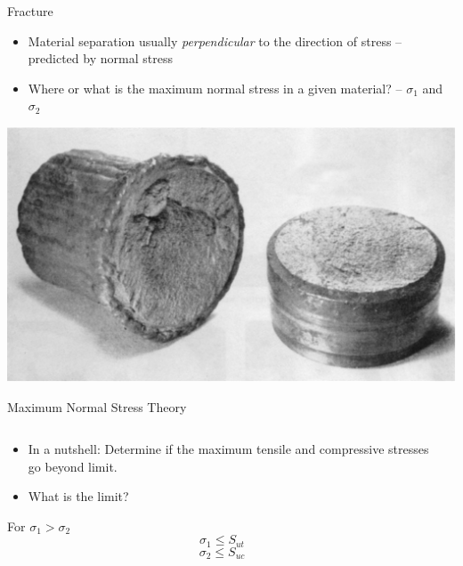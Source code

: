 \documentclass[10pt, svgnames]{beamer}
\begin{document}
\begin{frame}[label={sec:org1c5aaf5}]{Fracture}
\begin{itemize}
\item Material separation usually \emph{perpendicular} to the direction of stress -- predicted by normal stress
\item Where or what is the maximum normal stress in a given material? -- \(\sigma_1\) and \(\sigma_2\)
\end{itemize}

\begin{center}
\includegraphics[width=.9\linewidth]{pictures/brittle-failure.pdf}
\end{center}
\end{frame}

\begin{frame}[label={sec:orga01fd15}]{Maximum Normal Stress Theory}
\begin{columns}
\begin{column}{0.4\columnwidth}
\begin{itemize}
\item In a nutshell: Determine if the maximum tensile and compressive stresses go beyond limit.
\item What is the limit?
\end{itemize}

For \(\sigma_1 > \sigma_2\)
$$\sigma_1 \leqslant S_{ut} $$
$$\sigma_2 \leqslant S_{uc} $$
\end{column}

\begin{column}{0.6\columnwidth}
\end{column}
\end{columns}
\end{frame}
\end{document}
